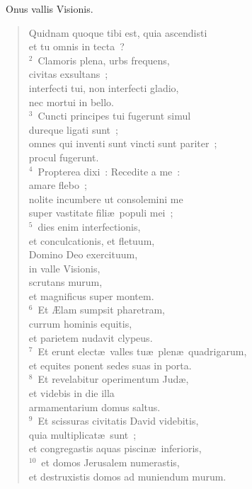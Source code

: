 ~Onus vallis Visionis. \begin{flushleft}\begin{verse}\vspace{6pt}Quidnam quoque tibi est, quia ascendisti\\ et tu omnis in tecta~?\\
${}^{2}$~Clamoris plena, urbs frequens,\\ civitas exsultans~;\\ interfecti tui, non interfecti gladio,\\ nec mortui in bello.\\
${}^{3}$~Cuncti principes tui fugerunt simul\\ dureque ligati sunt~;\\ omnes qui inventi sunt vincti sunt pariter~;\\ procul fugerunt.\\
${}^{4}$~Propterea dixi~: Recedite a me~:\\ amare flebo~;\\ nolite incumbere ut consolemini me\\ super vastitate fili\ae\ populi mei~;\\
${}^{5}$~dies enim interfectionis,\\ et conculcationis, et fletuum,\\ Domino Deo exercituum,\\ in valle Visionis,\\ scrutans murum,\\ et magnificus super montem.\\
${}^{6}$~Et \AE lam sumpsit pharetram,\\ currum hominis equitis,\\ et parietem nudavit clypeus.\\
${}^{7}$~Et erunt elect\ae\ valles tu\ae\ plen\ae\ quadrigarum,\\ et equites ponent sedes suas in porta.\\
${}^{8}$~Et revelabitur operimentum Jud\ae ,\\ et videbis in die illa\\ armamentarium domus saltus.\\
${}^{9}$~Et scissuras civitatis David videbitis,\\ quia multiplicat\ae\ sunt~;\\ et congregastis aquas piscin\ae\ inferioris,\\
${}^{10}$~et domos Jerusalem numerastis,\\ et destruxistis domos ad muniendum murum.\\

\end{verse}
\end{flushleft}

